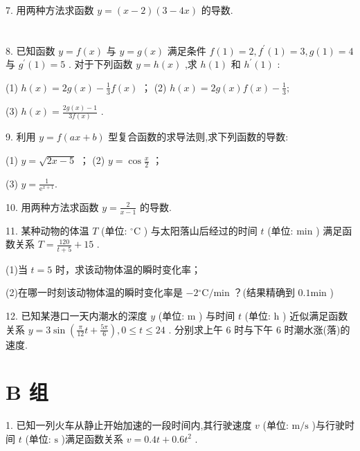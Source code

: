 \documentclass[10pt]{article}
\begin{document}
7. 用两种方法求函数 \(y = \left( {x - 2}\right) \left( {3 - {4x}}\right)\) 的导数.

\section*{}

\section*{}

8. 已知函数 \(y = f\left( x\right)\) 与 \(y = g\left( x\right)\) 满足条件 \(f\left( 1\right)  = 2,{f}^{\prime }\left( 1\right)  = 3,g\left( 1\right)  = 4\) 与 \({g}^{\prime }\left( 1\right)  = 5\) . 对于下列函数 \(y = h\left( x\right)\) ,求 \(h\left( 1\right)\) 和 \({h}^{\prime }\left( 1\right)\) :

(1) \(h\left( x\right)  = {2g}\left( x\right)  - \frac{1}{3}f\left( x\right)\) ； (2) \(h\left( x\right)  = {2g}\left( x\right) f\left( x\right)  - \frac{1}{3};\)

(3) \(h\left( x\right)  = \frac{{2g}\left( x\right)  - 1}{{3f}\left( x\right) }\) .

9. 利用 \(y = f\left( {{ax} + b}\right)\) 型复合函数的求导法则,求下列函数的导数:

(1) \(y = \sqrt{{2x} - 5}\) ； (2) \(y = \cos \frac{x}{2}\) ；

(3) \(y = \frac{1}{{\mathrm{e}}^{x + 1}}.\)

10. 用两种方法求函数 \(y = \frac{2}{x - 1}\) 的导数.

11. 某种动物的体温 \(T\) (单位: \({}^{ \circ  }\mathrm{C}\) ) 与太阳落山后经过的时间 \(t\) (单位: \(\mathrm{{min}}\) ) 满足函数关系 \(T = \frac{120}{t + 5} + {15}\) .

(1)当 \(t = 5\) 时，求该动物体温的瞬时变化率；

(2)在哪一时刻该动物体温的瞬时变化率是 \(- 2{}^{ \circ  }\mathrm{C}/\mathrm{{min}}\) ？(结果精确到 \({0.1}\mathrm{{min}}\) )

12. 已知某港口一天内潮水的深度 \(y\) (单位: \(\mathrm{m}\) ) 与时间 \(t\) (单位: \(\mathrm{h}\) ) 近似满足函数关系 \(y = 3\sin \left( {\frac{\pi }{12}t + \frac{5\pi }{6}}\right) ,0 \leq  t \leq  {24}\) . 分别求上午 6 时与下午 6 时潮水涨(落)的速度.

\section*{B 组}

1. 已知一列火车从静止开始加速的一段时间内,其行驶速度 \(v\) (单位: \(\mathrm{m}/\mathrm{s}\) )与行驶时间 \(t\) (单位: \(\mathrm{s}\) )满足函数关系 \(v = {0.4t} + {0.6}{t}^{2}\) .
\end{document}

